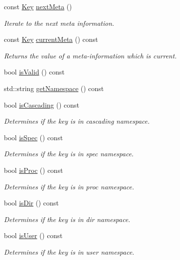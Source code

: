 \begin{DoxyCompactItemize}
const \hyperlink{classkdb_1_1Key}{Key} \hyperlink{classkdb_1_1Key_a855f37fef58a4ea4006d9e281f66cfe1}{next\+Meta} ()
\begin{DoxyCompactList}\small\item\em Iterate to the next meta information. \end{DoxyCompactList}\item 
const \hyperlink{classkdb_1_1Key}{Key} \hyperlink{classkdb_1_1Key_a848292bf5591e5e845f74a487697cb19}{current\+Meta} () const
\begin{DoxyCompactList}\small\item\em Returns the value of a meta-\/information which is current. \end{DoxyCompactList}\item 
bool \hyperlink{classkdb_1_1Key_a69e621790e5717c56f7275e0b8d5e27c}{is\+Valid} () const
\item 
std\+::string \hyperlink{classkdb_1_1Key_a71b191c56eacb692c2f92ed440b32b46}{get\+Namespace} () const
\item 
bool \hyperlink{classkdb_1_1Key_a024ecb6d7c87244fb83c3fee58a0d696}{is\+Cascading} () const
\begin{DoxyCompactList}\small\item\em Determines if the key is in cascading namespace. \end{DoxyCompactList}\item 
bool \hyperlink{classkdb_1_1Key_acf01e9a60bbd0e2768be782d149ac700}{is\+Spec} () const
\begin{DoxyCompactList}\small\item\em Determines if the key is in spec namespace. \end{DoxyCompactList}\item 
bool \hyperlink{classkdb_1_1Key_aa89cffb4d2a623920ff9abc086fde241}{is\+Proc} () const
\begin{DoxyCompactList}\small\item\em Determines if the key is in proc namespace. \end{DoxyCompactList}\item 
bool \hyperlink{classkdb_1_1Key_a0c60f261479e4e21cc5e9acd76c0d26b}{is\+Dir} () const
\begin{DoxyCompactList}\small\item\em Determines if the key is in dir namespace. \end{DoxyCompactList}\item 
bool \hyperlink{classkdb_1_1Key_a3b3d0d74246b259b10caed425216d91c}{is\+User} () const
\begin{DoxyCompactList}\small\item\em Determines if the key is in user namespace. \end{DoxyCompactList}\item 

\end{DoxyCompactItemize}

